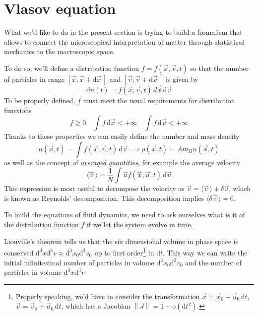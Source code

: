 \section{Vlasov equation}
What we'd like to do in the present section is trying to build a formalism that allows to connect the microscopical interpretation of matter through statistical mechanics to the macroscopic space.
\par To do so, we'll define a distribution function $f = f(\vec{x}, \vec{v}, t)$ so that the number of particles in range $[\vec{x}, \vec{x}+\text{d}\vec{x}\,]$ and $[\vec{v}, \vec{v}+\text{d}\vec{v}\,]$ is given by 
\begin{equation}
    \text{d}n(t) = f(\vec{x}, \vec{v}, t)\,{d}\vec{x}\,\text{d}\vec{v}
\end{equation}
To be properly defined, $f$ must meet the usual requirements for distribution functions
\begin{equation}
    f \geqslant 0 \quad \int f\,\text{d}\vec{x} < +\infty \quad \int f\,\text{d}\vec{v} < +\infty
\end{equation}
Thanks to these properties we can easily define the number and mass density 
\begin{equation*}
    n(\vec{x}, t) = \int f(\vec{x}, \vec{v}, t)\,\text{d}\vec{v} \implies \rho(\vec{x}, t) = Am_{H}n(\vec{x}, t)
\end{equation*}
as well as the concept of \emph{averaged quantities}, for example the average velocity
\begin{equation*}
    \langle \vec{v}\,\rangle = \frac{1}{N}\int \vec{u}f(\vec{x}, \vec{u}, t)\,\text{d}\vec{u}
\end{equation*}
This expression is most useful to decompose the velocity as $\vec{v} = \langle \vec{v}\, \rangle +\delta \vec{v}$, which is known as Reynolds' decomposition. This decomposition implies $\langle \delta\vec{v}\,\rangle = 0$.
\par To build the equations of fluid dynamics, we need to ask ourselves what is it of the distribution function $f$ if we let the system evolve in time.
\par Liouville's theorem tells us that the six dimensional volume in phase space is conserved $\text{d}^{3}x\text{d}^{3}v \approx \text{d}^{3}x_{0}\text{d}^{3}v_{0}$ up to first order\footnote{Properly speaking, we'd have to consider the transformation $\vec{x} = \vec{x}_{0}+\vec{u}_{0}\,\text{d}t$, $\vec{v} = \vec{v}_{0}+\vec{a}_{0}\,\text{d}t$, which has a Jacobian $\left\|J\right\| = 1+\text{o}(\text{d}t^{2})$.} in $\text{d}t$. This way we can write the initial infinitesimal number of particles in volume $\text{d}^{3}x_{0}\text{d}^{3}v_{0}$ and the number of particles in volume $\text{d}^{3}x\text{d}^{3}v$
